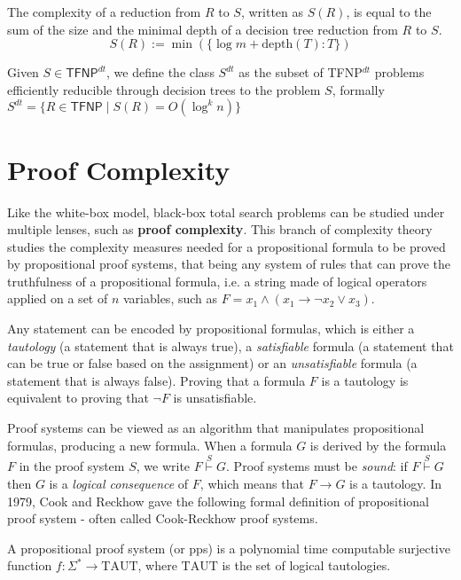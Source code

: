 The complexity of a reduction from $R$ to $S$, written as $S(R)$, is equal to the sum of the size and the minimal depth of a decision tree reduction from $R$ to $S$.
\[S(R) := \min(\{\log m + \mathrm{depth}(T) : T\})\]

\begin{definition}
 Given $S \in \mathsf{TFNP}^{dt}$, we define the class $S^{dt}$ as the subset of \textsf{TFNP}$^{dt}$ problems efficiently reducible through decision trees to the problem $S$, formally $S^{dt} = \{R \in \mathsf{TFNP} \mid S(R) = O(\log^k n)\}$
\end{definition}

\section{Proof Complexity}

Like the white-box model, black-box total search problems can be studied under multiple lenses, such as \textbf{proof complexity}. This branch of complexity theory studies the complexity measures needed for a propositional formula to be proved by propositional proof systems, that being any system of rules that can prove the truthfulness of a propositional formula, i.e. a string made of logical operators applied on a set of $n$ variables, such as $F = x_1 \land (x_1 \to \lnot x_2 \lor x_3)$.

Any statement can be encoded by propositional formulas, which is either a \textit{tautology} (a statement that is always true), a \textit{satisfiable} formula (a statement that can be true or false based on the assignment) or an \textit{unsatisfiable} formula (a statement that is always false). Proving that a formula $F$ is a tautology is equivalent to proving that $\lnot F$ is unsatisfiable.

Proof systems can be viewed as an algorithm that manipulates propositional formulas, producing a new formula. When a formula $G$ is derived by the formula $F$ in the proof system $S$, we write $F \stackrel{S}{\vdash} G$. Proof systems must be \textit{sound}: if $F \stackrel{S}{\vdash} G$ then $G$ is a \textit{logical consequence} of $F$, which means that $F \to G$ is a tautology. In 1979, Cook and Reckhow gave the following formal definition of propositional proof system - often called Cook-Reckhow proof systems.

\begin{definition}
 A propositional proof system (or pps) is a polynomial time computable surjective function $f : \Sigma^* \to \mathrm{TAUT}$, where $\mathrm{TAUT}$ is the set of logical tautologies.
\end{definition}

